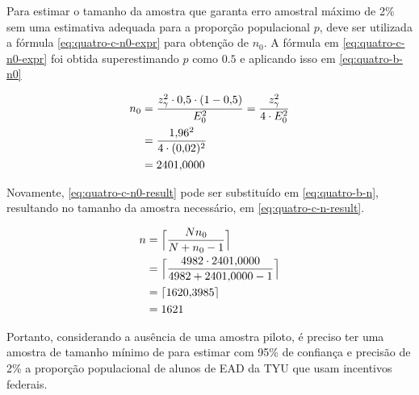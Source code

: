 	Para estimar o tamanho da amostra que garanta erro amostral máximo de
	2\% sem uma estimativa adequada para a proporção populacional $p$, deve
	ser utilizada a fórmula \eqref{eq:quatro-c-n0-expr} para obtenção de
	$n_0$. A fórmula em \eqref{eq:quatro-c-n0-expr} foi obtida
	superestimando $p$ como $\num{0.5}$ e aplicando isso em \eqref{eq:quatro-b-n0}

	\begin{align}
		n_0 &= \label{eq:quatro-c-n0-expr}
			   \frac{z_\gamma^2 \cdot \num{0.5} \cdot (1 - \num{0.5})}{E_0^2} = \frac{z_\gamma^2}{4 \cdot E_0^2} \\
			&= \frac{\num{1.96}^2}{4 \cdot (\num{0.02})^2} \nonumber \\
			&= \label{eq:quatro-c-n0-result}
			   \num{2401.0000}
	\end{align}

	Novamente, \eqref{eq:quatro-c-n0-result} pode ser substituído em
	\eqref{eq:quatro-b-n}, resultando no tamanho da amostra necessário, em
	\eqref{eq:quatro-c-n-result}.

	\begin{align}
		n &= \Big\lceil \frac{N n_0}{N + n_0 - 1} \nonumber \Big\rceil \\
		  &= \Big\lceil \frac{4982 \cdot \num{2401.0000}}{4982 + \num{2401.0000} -1} \nonumber \Big\rceil \\
		  &= \lceil \num{1620.3985} \nonumber \rceil \\
		  &= \label{eq:quatro-c-n-result} 
			 1621
	\end{align}

	Portanto, considerando a ausência de uma amostra piloto, é preciso ter
	uma amostra de tamanho mínimo de \QUATROCnceil para estimar com 95\% de
	confiança e precisão de 2\% a proporção populacional de alunos de EAD da
	TYU que usam incentivos federais.
